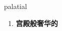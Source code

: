 
\begin{frame}
{\huge palatial}
\begin{center}
\begin{enumerate}\Large
  \item \textbf{宫殿般奢华的}
\end{enumerate}
\end{center}
\end{frame}
